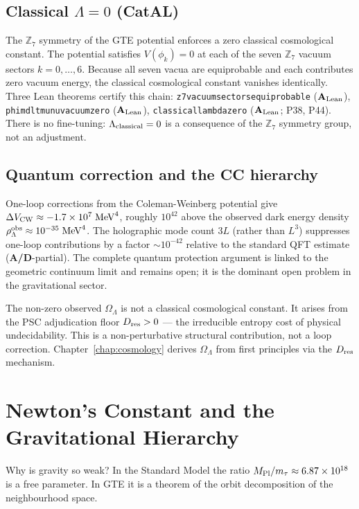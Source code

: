 \documentclass[11pt,openany]{book}
\theoremstyle{remark}
\newcommand{\ZS}{\mathbb{Z}_7}
\newcommand{\lean}[1]{%
  \penalty-100
  \begingroup\def\_{\textunderscore\allowbreak}\texttt{#1}\endgroup}
\newcommand{\mtau}{m_\tau}
\newcommand{\MPl}{M_{\rm Pl}}
\newcommand{\Dres}{D_{\rm res}}
\newcommand{\CMCA}{\text{CMCA}}
\newcommand{\CatAL}{\ensuremath{\textbf{A}_{\rm Lean}}}
\newcommand{\CatAD}{\textbf{A/D}}
\begin{document}
\subsection*{Classical $\Lambda = 0$ (CatAL)}

The $\ZS$ symmetry of the GTE potential enforces a zero classical cosmological
constant.
The potential satisfies $V(\phi_k) = 0$ at each of the seven $\ZS$ vacuum sectors
$k = 0,\ldots,6$.
Because all seven vacua are equiprobable and each contributes zero vacuum energy,
the classical cosmological constant vanishes identically.
Three Lean theorems certify this chain:
\lean{z7\_vacuum\_sectors\_equiprobable} (\CatAL),
\lean{phimdl\_tmunu\_vacuum\_zero} (\CatAL),
\lean{classical\_lambda\_zero} (\CatAL; P38, P44).
There is no fine-tuning: $\Lambda_{\rm classical} = 0$ is a consequence of the $\ZS$
symmetry group, not an adjustment.

\subsection*{Quantum correction and the CC hierarchy}

One-loop corrections from the Coleman-Weinberg potential give
$\Delta V_{\rm CW} \approx -1.7\times10^7\;\text{MeV}^4$, roughly $10^{42}$ above
the observed dark energy density $\rho_\Lambda^{\rm obs} \approx 10^{-35}\;\text{MeV}^4$.
The holographic mode count $3L$ (rather than $L^3$) suppresses one-loop contributions
by a factor $\sim 10^{-42}$ relative to the standard QFT estimate (\CatAD-partial).
The complete quantum protection argument is linked to the geometric continuum limit and
remains open; it is the dominant open problem in the gravitational sector.

The non-zero observed $\Omega_\Lambda$ is not a classical cosmological constant.
It arises from the PSC adjudication floor $\Dres > 0$ --- the irreducible entropy cost
of physical undecidability.
This is a non-perturbative structural contribution, not a loop correction.
Chapter~\ref{chap:cosmology} derives $\Omega_\Lambda$ from first principles via the
$\Dres$ mechanism.

\section{Newton's Constant and the Gravitational Hierarchy}
\label{sec:newton}

Why is gravity so weak?
In the Standard Model the ratio $\MPl/\mtau \approx 6.87\times10^{18}$ is a
free parameter.
In GTE it is a theorem of the orbit decomposition of the \CMCA{} neighbourhood space.
\end{document}
